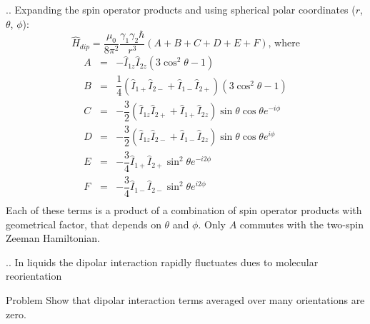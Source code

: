 \documentclass[handout]{beamer}
\begin{document}
\begin{frame}{\thesection.\thesubsection. \insertsubsection}
	Expanding the spin operator products and using spherical polar coordinates ($r$, $\theta$, $\phi$):
	\begin{equation}
	\hat{H}_{dip} = \dfrac{\mu_0}{8 \pi^2} \dfrac{\gamma_1 \gamma_2 \hbar}{r^3} (A+B+C+D+E+F)  \text{, where} 
	\end{equation}
	\begin{equation}
	\begin{array}{cll}
	   A &=& -\hat{I}_{1z} \hat{I}_{2z} (3 \cos^2 \theta - 1) \\
	   B &=& \dfrac{1}{4} ( \hat{I}_{1+} \hat{I}_{2-} + \hat{I}_{1-} \hat{I}_{2+}) (3 \cos^2 \theta - 1) \\
	   C &=& -\dfrac{3}{2} ( \hat{I}_{1z} \hat{I}_{2+} + \hat{I}_{1+} \hat{I}_{2z}) \sin \theta \cos \theta e^{-i\phi} \\
   	   D &=& -\dfrac{3}{2} ( \hat{I}_{1z} \hat{I}_{2-} + \hat{I}_{1-} \hat{I}_{2z}) \sin \theta \cos \theta e^{i\phi} \\
   	   E &=& -\dfrac{3}{4} \hat{I}_{1+} \hat{I}_{2+} \sin^2 \theta e^{-i 2 \phi} \\
   	   F &=& -\dfrac{3}{4} \hat{I}_{1-} \hat{I}_{2-} \sin^2 \theta e^{i 2 \phi} \\
	\end{array}
	\end{equation}
	Each of these terms is a product of a combination of spin operator products with geometrical factor, that depends on $\theta$ and $\phi$. Only $A$ commutes with the two-spin Zeeman Hamiltonian.
\end{frame}

\begin{frame}{\thesection.\thesubsection. \insertsubsection}
	In liquids the dipolar interaction rapidly fluctuates dues to molecular reorientation
	\begin{block}{Problem}
		Show that dipolar interaction terms averaged over many orientations are zero.
	\end{block}
\end{frame}
\end{document}
